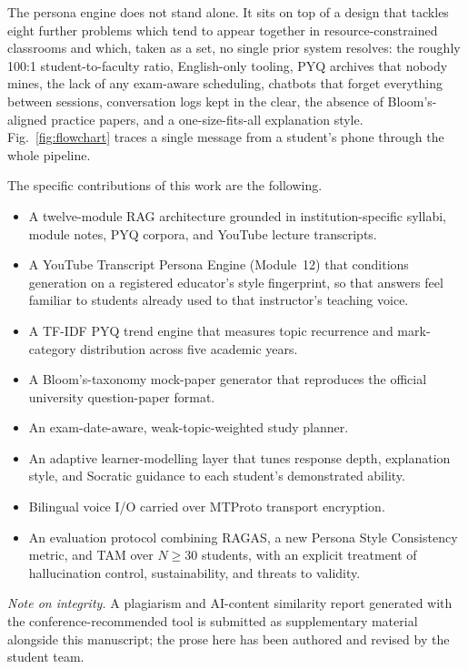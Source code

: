 \documentclass[conference]{IEEEtran}
\begin{document}
The persona engine does not stand alone. It sits on top of a design
that tackles eight further problems which tend to appear together in
resource-constrained classrooms and which, taken as a set, no single
prior system resolves: the roughly 100:1 student-to-faculty ratio,
English-only tooling, PYQ archives that nobody mines, the lack of any
exam-aware scheduling, chatbots that forget everything between
sessions, conversation logs kept in the clear, the absence of
Bloom's-aligned practice papers, and a one-size-fits-all explanation
style. Fig.~\ref{fig:flowchart} traces a single message from a
student's phone through the whole pipeline.

The specific contributions of this work are the following.
\begin{itemize}
    \item A twelve-module RAG architecture grounded in
          institution-specific syllabi, module notes, PYQ corpora, and
          YouTube lecture transcripts.
    \item A YouTube Transcript Persona Engine (Module~12) that
          conditions generation on a registered educator's style
          fingerprint, so that answers feel familiar to students
          already used to that instructor's teaching voice.
    \item A TF-IDF PYQ trend engine that measures topic recurrence and
          mark-category distribution across five academic years.
    \item A Bloom's-taxonomy mock-paper generator that reproduces the
          official university question-paper format.
    \item An exam-date-aware, weak-topic-weighted study planner.
    \item An adaptive learner-modelling layer that tunes response
          depth, explanation style, and Socratic guidance to each
          student's demonstrated ability.
    \item Bilingual voice I/O carried over MTProto transport encryption.
    \item An evaluation protocol combining RAGAS, a new Persona Style
          Consistency metric, and TAM over $N \geq 30$ students, with
          an explicit treatment of hallucination control, sustainability,
          and threats to validity.
\end{itemize}

\noindent\textit{Note on integrity.} A plagiarism and AI-content
similarity report generated with the conference-recommended tool is
submitted as supplementary material alongside this manuscript; the
prose here has been authored and revised by the student team.
\end{document}
